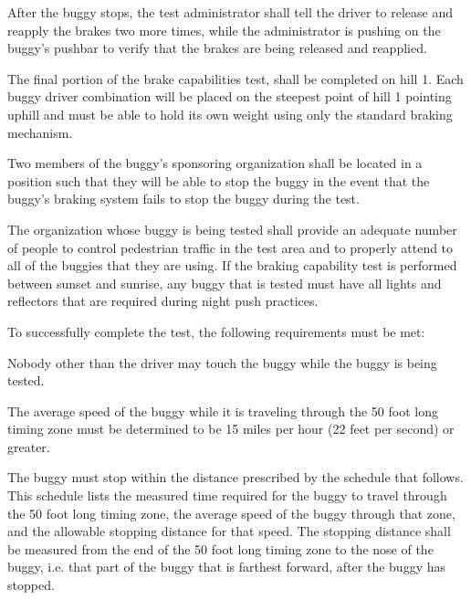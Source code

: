 	After the buggy stops, the test administrator shall tell the driver to release
	and reapply the brakes two more times, while the administrator is pushing on
	the buggy's pushbar to verify that the brakes are being released and reapplied.

	The final portion of the brake capabilities test, shall be completed on hill 1.
	Each buggy driver combination will be placed on the steepest point of hill 1
	pointing uphill and must be able to hold its own weight using only the standard
	braking mechanism.

	Two members of the buggy's sponsoring organization shall be located in a
	position such that they will be able to stop the buggy in the event that the
	buggy's braking system fails to stop the buggy during the test.

	The organization whose buggy is being tested shall provide an adequate number
	of people to control pedestrian traffic in the test area and to properly attend
	to all of the buggies that they are using. If the braking capability test is
	performed between sunset and sunrise, any buggy that is tested must have all
	lights and reflectors that are required during night push practices.

	To successfully complete the test, the following requirements must be met:

	Nobody other than the driver may touch the buggy while the buggy is being
	tested.

	The average speed of the buggy while it is traveling through the 50 foot long
	timing zone must be determined to be 15 miles per hour (22 feet per second) or
	greater.

	The buggy must stop within the distance prescribed by the schedule that
	follows. This schedule lists the measured time required for the buggy to travel
	through the 50 foot long timing zone, the average speed of the buggy through
	that zone, and the allowable stopping distance for that speed. The stopping
	distance shall be measured from the end of the 50 foot long timing zone to the
	nose of the buggy, i.e. that part of the buggy that is farthest forward, after
	the buggy has stopped.

